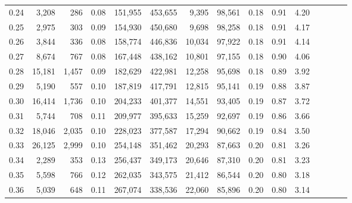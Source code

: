 \begin{tabular}{rrrcrrrrrrrrrrr}
0.24 &   3,208 &    286 &                                       0.08 &  151,955 &  453,655 &    9,395 &   98,561 &  0.18 &  0.91 &                         4.20 \\
0.25 &   2,975 &    303 &                                       0.09 &  154,930 &  450,680 &    9,698 &   98,258 &  0.18 &  0.91 &                         4.17 \\
0.26 &   3,844 &    336 &                                       0.08 &  158,774 &  446,836 &   10,034 &   97,922 &  0.18 &  0.91 &                         4.14 \\
0.27 &   8,674 &    767 &                                       0.08 &  167,448 &  438,162 &   10,801 &   97,155 &  0.18 &  0.90 &                         4.06 \\
0.28 &  15,181 &  1,457 &                                       0.09 &  182,629 &  422,981 &   12,258 &   95,698 &  0.18 &  0.89 &                         3.92 \\
0.29 &   5,190 &    557 &                                       0.10 &  187,819 &  417,791 &   12,815 &   95,141 &  0.19 &  0.88 &                         3.87 \\
0.30 &  16,414 &  1,736 &                                       0.10 &  204,233 &  401,377 &   14,551 &   93,405 &  0.19 &  0.87 &                         3.72 \\
0.31 &   5,744 &    708 &                                       0.11 &  209,977 &  395,633 &   15,259 &   92,697 &  0.19 &  0.86 &                         3.66 \\
0.32 &  18,046 &  2,035 &                                       0.10 &  228,023 &  377,587 &   17,294 &   90,662 &  0.19 &  0.84 &                         3.50 \\
0.33 &  26,125 &  2,999 &                                       0.10 &  254,148 &  351,462 &   20,293 &   87,663 &  0.20 &  0.81 &                         3.26 \\
0.34 &   2,289 &    353 &                                       0.13 &  256,437 &  349,173 &   20,646 &   87,310 &  0.20 &  0.81 &                         3.23 \\
0.35 &   5,598 &    766 &                                       0.12 &  262,035 &  343,575 &   21,412 &   86,544 &  0.20 &  0.80 &                         3.18 \\
0.36 &   5,039 &    648 &                                       0.11 &  267,074 &  338,536 &   22,060 &   85,896 &  0.20 &  0.80 &                         3.14 \\

\end{tabular}
